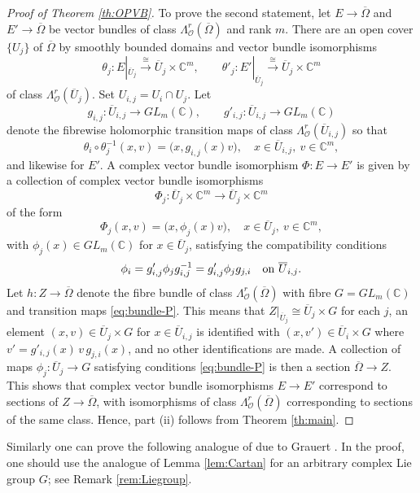 \documentclass[11pt]{amsart}
\numberwithin{equation}{section}
\theoremstyle{definition}
\newcommand\Oscr{\mathscr{O}}
\newcommand\C{\mathbb{C}}
\newcommand\lra{\longrightarrow}
\begin{document}
\begin{proof}[Proof of Theorem \ref{th:OPVB}]
To prove the second statement, let $E\to \overline\Omega$ and 
$E' \to \overline\Omega$ be vector bundles of class
$\Lambda^r_\Oscr(\overline\Omega)$ and rank $m$. 
There are an open cover $\{U_j\}$ of ${\overline\Omega}$ 
by smoothly bounded domains and vector bundle isomorphisms 
\[
	\theta_j: E|_{\overline U_j} \stackrel{\cong}{\lra} \overline U_j\times\C^m,
	\qquad
	\theta'_j: E'|_{\overline U_j} \stackrel{\cong}{\lra} 
	\overline U_j\times\C^m
\]
of class $\Lambda^r_\Oscr(\overline U_j)$. Set $U_{i,j}=U_i\cap U_j$. Let
\[
    g_{i,j} :  \overline U_{i,j} \to GL_m(\C), \qquad 
    g'_{i,j} : \overline U_{i,j} \to GL_m(\C)
\]
denote the fibrewise holomorphic transition maps of 
class $\Lambda^r_\Oscr(\overline U_{i,j})$ so that 
\[
    \theta_i \circ\theta_j^{-1}(x,v)= \bigl(x,g_{i,j}(x)v\bigr),
    \quad x \in \overline U_{i,j},\ v\in\C^m,
\]
and likewise for $E'$. A complex vector bundle isomorphism 
$\Phi : E \to E'$ is given by a collection of complex vector bundle 
isomorphisms 
\[ 
	\Phi_j: \overline U_j\times\C^m\to \overline U_j\times \C^m
\] 
of the form
\[
    \Phi_j(x,v)=\bigl(x,\phi_j(x)v\bigr),
    \quad x\in \overline U_j, \ v\in \C^m, 
\]
with $\phi_j(x)\in GL_m(\C)$ for $x\in \overline U_j$, 
satisfying the compatibility conditions
\begin{equation}\label{eq:bundle-P}
    \phi_i   = g'_{i,j}\phi_j g_{i,j}^{-1} 
    		= g'_{i,j} \phi_j g_{j,i} \quad {\rm on}\ \overline U_{i,j}.
\end{equation}
Let $h:Z\to {\overline\Omega}$ denote the fibre bundle of
class $\Lambda^r_\Oscr(\overline\Omega)$
with fibre $G=GL_m(\C)$ and transition maps \eqref{eq:bundle-P}. 
This means that $Z|_{\overline U_j}\cong \overline U_j\times G$ 
for each $j$, an element $(x,v) \in \overline U_j\times G$ 
for $x\in \overline U_{i,j}$ is identified with
$(x,v')\in \overline U_i\times G$ where $v'= g'_{i,j}(x)\, v \, g_{j,i}(x)$,
and no other identifications are made. 
A collection of maps $\phi_j : \overline  U_j\to G$ satisfying
conditions \eqref{eq:bundle-P} is then a section ${\overline\Omega}\to Z$. 
This shows that complex vector bundle isomorphisms $E\to E'$ 
correspond to sections of $Z\to {\overline\Omega}$, with 
isomorphisms of class $\Lambda^r_\Oscr(\overline\Omega)$
corresponding to sections of the same class. 
Hence, part (ii) follows from Theorem \ref{th:main}.
\end{proof}


Similarly one can prove the following analogue of 
\cite[Theorem 8.2.1]{Forstneric2017E} due to Grauert \cite{Grauert1958MA}.
In the proof, one should use the analogue of Lemma \ref{lem:Cartan} for an
arbitrary complex Lie group $G$; see Remark \ref{rem:Liegroup}.
\end{document}
